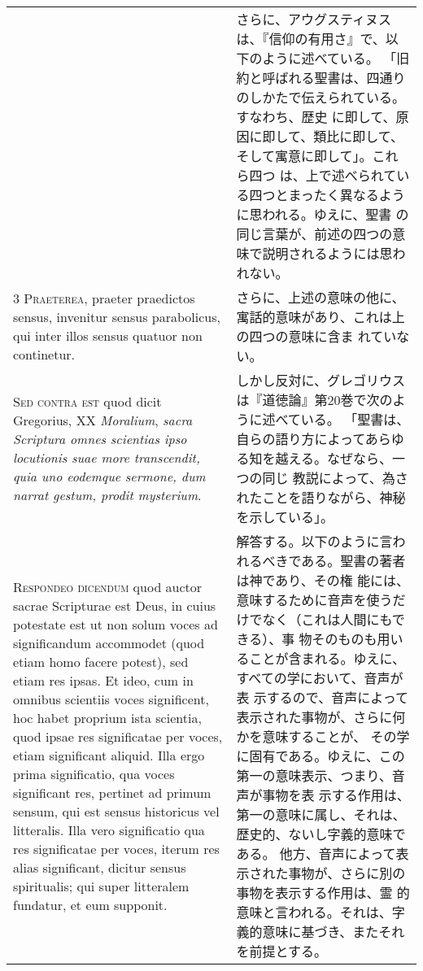 \documentclass[10pt]{jsarticle}
\begin{document}
\begin{longtable}{p{21em}p{21em}}
&

さらに、アウグスティヌスは、『信仰の有用さ』で、以下のように述べている。
「旧約と呼ばれる聖書は、四通りのしかたで伝えられている。すなわち、歴史
に即して、原因に即して、類比に即して、そして寓意に即して」。これら四つ
は、上で述べられている四つとまったく異なるように思われる。ゆえに、聖書
の同じ言葉が、前述の四つの意味で説明されるようには思われない。


\\


{\scshape 3 Praeterea}, praeter praedictos sensus, invenitur sensus
parabolicus, qui inter illos sensus quatuor non continetur.


&


さらに、上述の意味の他に、寓話的意味があり、これは上の四つの意味に含ま
れていない。

\\


{\scshape Sed contra est} quod dicit Gregorius, XX {\itshape
Moralium}, {\itshape sacra Scriptura omnes scientias ipso locutionis
suae more transcendit, quia uno eodemque sermone, dum narrat gestum,
prodit mysterium}.


&

しかし反対に、グレゴリウスは『道徳論』第20巻で次のように述べている。
「聖書は、自らの語り方によってあらゆる知を越える。なぜなら、一つの同じ
教説によって、為されたことを語りながら、神秘を示している」。


\\


{\scshape Respondeo dicendum} quod auctor sacrae Scripturae est Deus,
in cuius potestate est ut non solum voces ad significandum accommodet
(quod etiam homo facere potest), sed etiam res ipsas. Et ideo, cum in
omnibus scientiis voces significent, hoc habet proprium ista scientia,
quod ipsae res significatae per voces, etiam significant aliquid. Illa
ergo prima significatio, qua voces significant res, pertinet ad primum
sensum, qui est sensus historicus vel litteralis. Illa vero
significatio qua res significatae per voces, iterum res alias
significant, dicitur sensus spiritualis; qui super litteralem
fundatur, et eum supponit.



&

解答する。以下のように言われるべきである。聖書の著者は神であり、その権
能には、意味するために音声を使うだけでなく（これは人間にもできる）、事
物そのものも用いることが含まれる。ゆえに、すべての学において、音声が表
示するので、音声によって表示された事物が、さらに何かを意味することが、
その学に固有である。ゆえに、この第一の意味表示、つまり、音声が事物を表
示する作用は、第一の意味に属し、それは、歴史的、ないし字義的意味である。
他方、音声によって表示された事物が、さらに別の事物を表示する作用は、霊
的意味と言われる。それは、字義的意味に基づき、またそれを前提とする。





\end{longtable}
\end{document}

